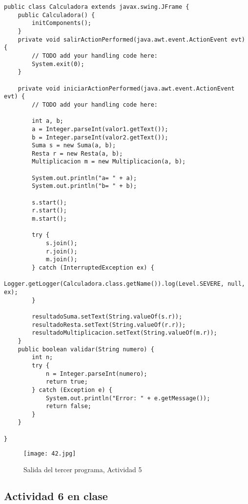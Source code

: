 \begin{verbatim}
public class Calculadora extends javax.swing.JFrame {
    public Calculadora() {
        initComponents();
    }
    private void salirActionPerformed(java.awt.event.ActionEvent evt) {                                      
        // TODO add your handling code here:
        System.exit(0);
    }                                     

    private void iniciarActionPerformed(java.awt.event.ActionEvent evt) {                                        
        // TODO add your handling code here:

        int a, b;
        a = Integer.parseInt(valor1.getText());
        b = Integer.parseInt(valor2.getText());
        Suma s = new Suma(a, b);
        Resta r = new Resta(a, b);
        Multiplicacion m = new Multiplicacion(a, b);

        System.out.println("a= " + a);
        System.out.println("b= " + b);

        s.start();
        r.start();
        m.start();

        try {
            s.join();
            r.join();
            m.join();
        } catch (InterruptedException ex) {
            Logger.getLogger(Calculadora.class.getName()).log(Level.SEVERE, null, ex);
        }

        resultadoSuma.setText(String.valueOf(s.r));
        resultadoResta.setText(String.valueOf(r.r));
        resultadoMultiplicacion.setText(String.valueOf(m.r));
    }
    public boolean validar(String numero) {
        int n;
        try {
            n = Integer.parseInt(numero);
            return true;
        } catch (Exception e) {
            System.out.println("Error: " + e.getMessage());
            return false;
        }
    }

}
\end{verbatim} \vspace{1cm}
\begin{figure}[h!]
		\centering
		{\texttt{[image: 42.jpg]}\par} 
		\caption{Salida del tercer programa, Actividad 5}\vspace{1cm}
\end{figure}

{\raggedright
\subsection{Actividad 6 en clase}
}\vspace{.5cm}

